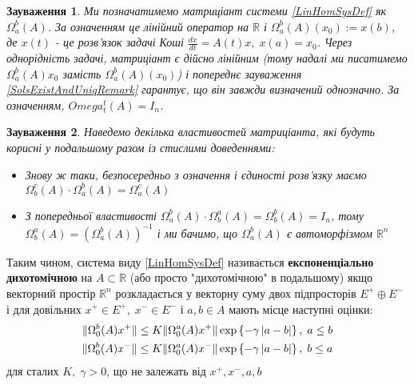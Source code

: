 \documentclass[14pt]{extarticle} %
\newtheorem{remark}{Зауваження}
\begin{document}
\begin{remark}
	Ми позначатимемо матриціант системи \ref{LinHomSysDef} як $\Omega_a^b(A)$. За означенням це лінійний
	оператор на $\mathbb{R}$ і $\Omega_a^b(A)(x_0):=x(b)$, де $x(t)$ - це розв’язок задачі Коші $\frac{dx}{dt}=
	A(t)x,\;x(a)=x_0$. Через однорідність задачі, матриціант є дійсно лінійним (тому надалі ми
	писатимемо $\Omega_a^b(A)x_0$ замість $\Omega_a^b(A)(x_0)$) і попереднє зауваження \ref{SolsExistAndUniqRemark}
	гарантує, що він завжди визначений однозначно. За означенням, $Omega^t_t(A)=I_n$.
\end{remark}
\begin{remark}
Наведемо декілька властивостей матриціанта, які будуть корисні у подальшому разом із стислими доведеннями:
\begin{itemize}
	\item{Знову ж таки, безпосередньо з означення і єдиності розв’язку маємо $\Omega_b^c(A)\cdot\Omega_a^b(A)=\Omega_a^c(A)$}
	\item{З попередньої властивості $\Omega_a^b(A)\cdot\Omega_b^a(A)=\Omega_b^b(A)=I_n$, тому $\Omega_b^a(A)=\left(\Omega_a^b(A)\right)^{-1}$
		і ми бачимо, що $\Omega_a^b(A)$ є автоморфізмом $\mathbb{R}^n$}
\end{itemize}
\end{remark}

Таким чином, система виду \ref{LinHomSysDef} називається \textbf{експоненціально дихотомічною} на $A\subset\mathbb{R}$
(або просто "дихотомічною" в подальшому) якщо векторний простір $\mathbb{R}^n$ розкладається
у векторну суму двох підпросторів $E^+\oplus E^-$ і для довільних $x^+\in E^+,\; x^-\in E^-$ і $a,b\in A$ мають місце наступні оцінки:
\begin{equation}\begin{aligned}\label{DichotomyDef}
	\|\Omega^b_0(A)x^+\|\leq K\|\Omega_0^a(A)x^+\|\exp\left\{-\gamma\left|a-b\right|\right\},\;a\leq b\\
	\|\Omega^b_0(A)x^-\|\leq K\|\Omega_0^a(A)x^-\|\exp\left\{-\gamma\left|a-b\right|\right\},\;b\leq a\\
\end{aligned}\end{equation}
для сталих $K,\;\gamma>0$, що не залежать від $x^+,x^-,a,b$
\end{document}
